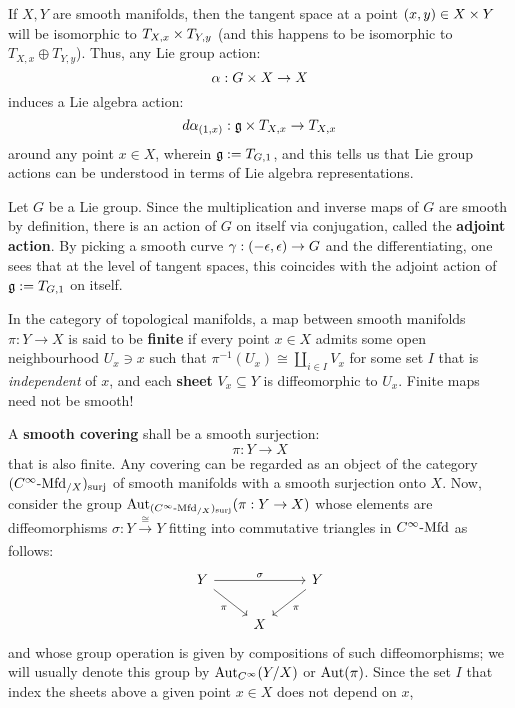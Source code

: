        If $X, Y$ are smooth manifolds, then the tangent space at a point $(x, y) \in X \x Y$ will be isomorphic to $T_{X, x} \x T_{Y, y}$ (and this happens to be isomorphic to $T_{X, x} \oplus T_{Y, y}$). Thus, any Lie group action:
            $$\alpha: G \x X \to  X$$
        induces a Lie algebra action:
            $$d\alpha_{(1, x)}: \g \x T_{X, x} \to T_{X, x}$$
        around any point $x \in X$, wherein $\mathfrak{g} := T_{G, 1}$, and this tells us that Lie group actions can be understood in terms of Lie algebra representations.
        \begin{example} \label{example: adjoint_actions}
            Let $G$ be a Lie group. Since the multiplication and inverse maps of $G$ are smooth by definition, there is an action of $G$ on itself via conjugation, called the \textbf{adjoint action}. By picking a smooth curve $\gamma: (-\epsilon, \epsilon) \to G$ and the differentiating, one sees that at the level of tangent spaces, this coincides with the adjoint action of $\mathfrak{g} := T_{G, 1}$ on itself. 
        \end{example}
        \begin{example} \label{example: coverings_and_deck_transformation}
            In the category of topological manifolds, a map between smooth manifolds $\pi: Y \to X$ is said to be \textbf{finite} if every point $x \in X$ admits some open neighbourhood $U_x \ni x$ such that $\pi^{-1}(U_x) \cong \coprod_{i \in I} V_x$ for some set $I$ that is \textit{independent} of $x$, and each \textbf{sheet} $V_x \subseteq Y$ is diffeomorphic to $U_x$. Finite maps need not be smooth!
        
            A \textbf{smooth covering} shall be a smooth surjection:
                $$\pi: Y \to X$$
            that is also finite. Any covering can be regarded as an object of the category $(C^{\infty}\text{-}\mathrm{Mfd}_{/X})_{\mathrm{surj}}$ of smooth manifolds with a smooth surjection onto $X$. Now, consider the group $\mathrm{Aut}_{(C^{\infty}\text{-}\mathrm{Mfd}_{/X})_{\mathrm{surj}}}(\pi: Y \to X)$ whose elements are diffeomorphisms $\sigma: Y \xrightarrow[]{\cong} Y$ fitting into commutative triangles in $C^{\infty}\text{-}\mathrm{Mfd}$ as follows:
                $$
                    \begin{tikzcd}
                	Y && Y \\
                	& X
                	\arrow["\sigma", from=1-1, to=1-3]
                	\arrow["\pi"', from=1-1, to=2-2]
                	\arrow["\pi", from=1-3, to=2-2]
                    \end{tikzcd}
                $$
            and whose group operation is given by compositions of such diffeomorphisms; we will usually denote this group by $\mathrm{Aut}_{C^{\infty}}(Y/X)$ or $\mathrm{Aut}(\pi)$. Since the set $I$ that index the sheets above a given point $x \in X$ does not depend on $x$, 
        \end{example}
